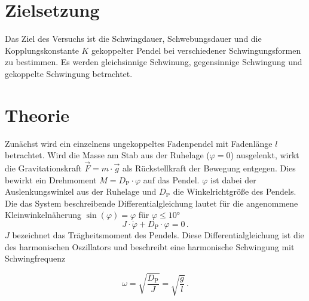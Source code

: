 \section{Zielsetzung}
\label{sec:Zielsetzung}
Das Ziel des Versuchs ist die Schwingdauer, Schwebungsdauer und die Kopplungskonstante $K$ gekoppelter Pendel bei verschiedener Schwingungsformen zu bestimmen. Es werden 
gleichsinnige Schwinung, gegensinnige Schwingung und gekoppelte Schwingung betrachtet.  

\section{Theorie}
\label{sec:Theorie}
Zunächst wird ein einzelnens ungekoppeltes Fadenpendel mit Fadenlänge $l$ betrachtet. 
Wird die Masse am Stab aus der Ruhelage ($\varphi = 0$) ausgelenkt, wirkt 
die Gravitationskraft $\vec{F} = m \cdot \vec{g}$ als Rückstellkraft der Bewegung entgegen. Dies bewirkt ein Drehmoment 
$M = D_{\text{P}} \cdot \varphi$ auf das Pendel. $\varphi$ ist dabei der Auslenkungswinkel aus der Ruhelage und $D_{\text{P}}$ die 
Winkelrichtgröße des Pendels. Die das System beschreibende Differentialgleichung lautet für die angenommene Kleinwinkelnäherung 
$\sin(\varphi) = \varphi$ für $\varphi \leq 10°$
\begin{equation}
    J \cdot \ddot{\varphi} + D_{\text{P}} \cdot \varphi = 0\, .
\end{equation}
$J$ bezeichnet das Trägheitsmoment des Pendels. Diese Differentialgleichung ist die des harmonischen Oszillators und beschreibt eine harmonische Schwingung 
mit Schwingfrequenz 

\begin{equation}
 \omega = \sqrt{\frac{D_{\text{P}}}{J}} = \sqrt{\frac{g}{l}}\, .
\end{equation}
\\
\\

